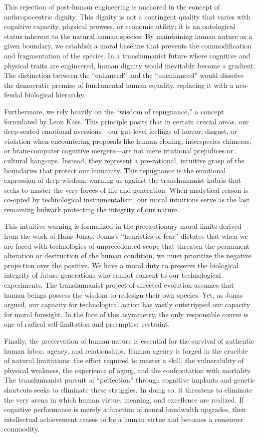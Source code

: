 This rejection of post-human engineering is anchored in the concept of
anthropocentric dignity. This dignity is not a contingent quality that
varies with cognitive capacity, physical prowess, or economic utility;
it is an ontological status inherent to the natural human species. By
maintaining human nature as a given boundary, we establish a moral
baseline that prevents the commodification and fragmentation of the
species. In a transhumanist future where cognitive and physical traits
are engineered, human dignity would inevitably become a gradient. The
distinction between the ``enhanced'' and the ``unenhanced'' would
dissolve the democratic premise of fundamental human equality, replacing
it with a neo-feudal biological hierarchy.

Furthermore, we rely heavily on the ``wisdom of repugnance,'' a concept
formulated by Leon Kass. This principle posits that in certain crucial
areas, our deep-seated emotional aversions---our gut-level feelings of
horror, disgust, or violation when encountering proposals like human
cloning, interspecies chimeras, or brain-computer cognitive
mergers---are not mere irrational prejudices or cultural hang-ups.
Instead, they represent a pre-rational, intuitive grasp of the
boundaries that protect our humanity. This repugnance is the emotional
expression of deep wisdom, warning us against the transhumanist hubris
that seeks to master the very forces of life and generation. When
analytical reason is co-opted by technological instrumentalism, our
moral intuitions serve as the last remaining bulwark protecting the
integrity of our nature.

This intuitive warning is formalized in the precautionary moral limits
derived from the work of Hans Jonas. Jonas's ``heuristics of fear''
dictates that when we are faced with technologies of unprecedented scope
that threaten the permanent alteration or destruction of the human
condition, we must prioritize the negative projection over the positive.
We have a moral duty to preserve the biological integrity of future
generations who cannot consent to our technological experiments. The
transhumanist project of directed evolution assumes that human beings
possess the wisdom to redesign their own species. Yet, as Jonas argued,
our capacity for technological action has vastly outstripped our
capacity for moral foresight. In the face of this asymmetry, the only
responsible course is one of radical self-limitation and preemptive
restraint.

Finally, the preservation of human nature is essential for the survival
of authentic human labor, agency, and relationships. Human agency is
forged in the crucible of natural limitations: the effort required to
master a skill, the vulnerability of physical weakness, the experience
of aging, and the confrontation with mortality. The transhumanist
pursuit of ``perfection'' through cognitive implants and genetic
shortcuts seeks to eliminate these struggles. In doing so, it threatens
to eliminate the very arena in which human virtue, meaning, and
excellence are realized. If cognitive performance is merely a function
of neural bandwidth upgrades, then intellectual achievement ceases to be
a human virtue and becomes a consumer commodity.

